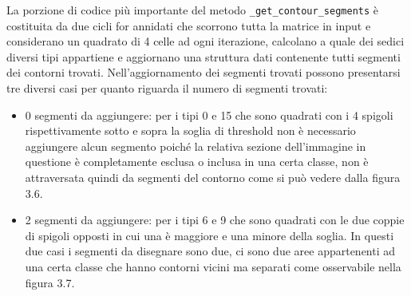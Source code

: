\documentclass[12pt,a4paper]{report}
\begin{document}
La porzione di codice più importante del metodo \verb|_get_contour_segments| è costituita da due cicli for annidati che scorrono tutta la matrice in input e considerano un quadrato di 4 celle ad ogni iterazione,  calcolano a quale dei sedici diversi tipi appartiene e aggiornano una struttura dati contenente tutti segmenti dei contorni trovati. \newline
Nell'aggiornamento dei segmenti trovati possono presentarsi tre diversi casi per quanto riguarda il numero di segmenti trovati:
\begin{itemize}
\item 0 segmenti da aggiungere: per i tipi 0 e 15 che sono quadrati con i 4 spigoli rispettivamente sotto e sopra la soglia di threshold non è necessario aggiungere alcun segmento poiché la relativa sezione dell'immagine in questione è completamente esclusa o inclusa in una certa classe,  non è attraversata quindi da segmenti del contorno come si può vedere dalla figura 3.6.
\begin{figure}[H]
\centering
\begin{floatrow}[1]
\end{floatrow}
\end{figure}
\item 2 segmenti da aggiungere: per i tipi 6 e 9 che sono quadrati con le due coppie di spigoli opposti in cui una è maggiore e una minore della soglia.  In questi due casi i segmenti da disegnare sono due,  ci sono due aree appartenenti ad una certa classe che hanno contorni vicini ma separati come osservabile nella figura 3.7.
\begin{figure}[H]
\centering
\begin{floatrow}[1]
\end{floatrow}
\end{figure}


\end{itemize}
\end{document}
